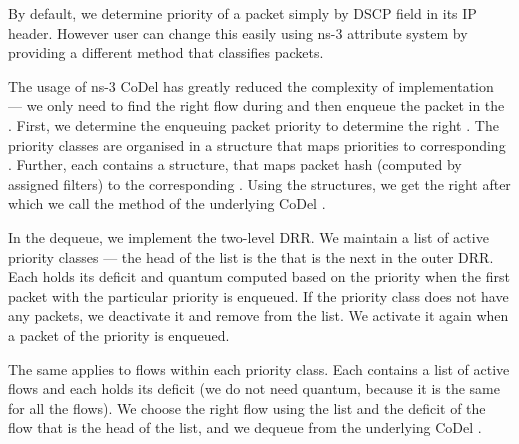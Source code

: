 By default, we determine priority of a packet simply by DSCP field in its IP header. However user can change this easily using ns-3 attribute system by providing a different method that classifies packets. 

The usage of ns-3 CoDel has greatly reduced the complexity of implementation --- we only need  to find the right flow during  and then enqueue the packet in the . First, we determine the enqueuing packet priority to determine the right . The priority classes are organised in a structure that maps priorities to corresponding . Further, each  contains a structure, that maps packet hash (computed by assigned filters) to the corresponding . Using the structures, we get the right  after which we call the  method of the underlying CoDel .

In the dequeue, we implement the two-level DRR. We maintain a list of active priority classes --- the head of the list is the  that is the next in the outer DRR. Each  holds its deficit and quantum computed based on the priority when the first packet with the particular priority is enqueued. If the priority class does not have any packets, we deactivate it and remove from the list. We activate it again when a packet of the priority is enqueued.

The same applies to flows within each priority class. Each  contains a list of active flows and each  holds its deficit (we do not need quantum, because it is the same for all the flows). We choose the right flow using the list and the deficit of the flow that is the head of the list, and we dequeue from the underlying CoDel .   












